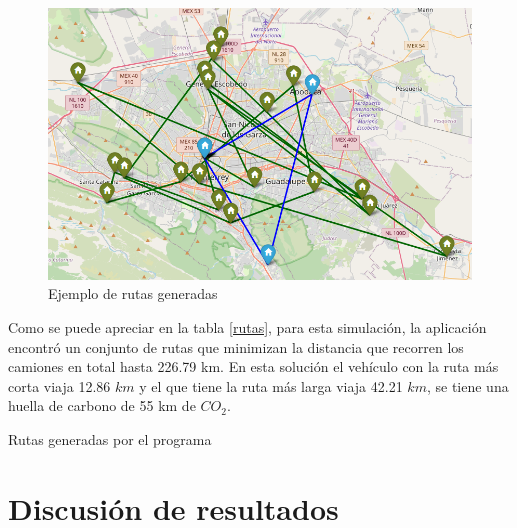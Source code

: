 \documentclass[journal]{IEEEtran}
\begin{document}
            \begin{figure}[H]
                \centering
                \includegraphics[scale=0.4]{../img/route-examples.png}
                \caption{Ejemplo de rutas generadas} 
                \label{fig:generated-routes}
            \end{figure}
            
            Como se puede apreciar en la tabla \ref{rutas}, para esta simulación, la aplicación encontró un conjunto de rutas que minimizan la distancia que recorren los camiones en total hasta 226.79 km. En esta solución el vehículo con la ruta más corta viaja 12.86 $km$ y el que tiene la ruta más larga viaja 42.21 $km$, se tiene una huella de carbono de 55 km de $CO_2$.
            
            \begin{table}[h!]
                \centering
                \caption{Rutas generadas por el programa}
                \label{rutas}
            \end{table}
            
    \section{Discusión de resultados} \label{sec:discusion}
        
\end{document}
